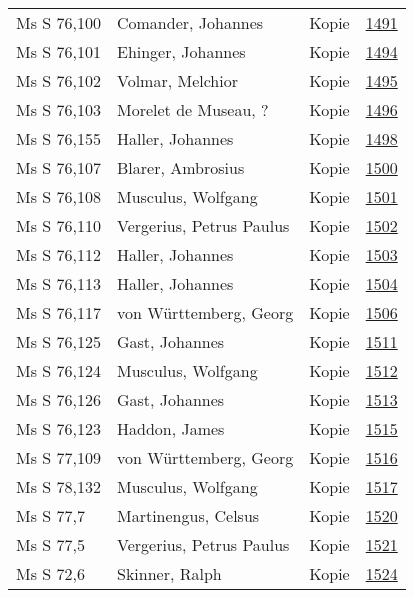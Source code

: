 \documentclass[10pt,a4paper,landscape]{report}
\begin{document}
\begin{longtable}{p{16cm}p{4cm}lr}
Ms S 76,100	&	Comander, Johannes	&	Kopie	&	\href{http://130.60.24.72/assignment/1491}{1491}\\
Ms S 76,101	&	Ehinger, Johannes	&	Kopie	&	\href{http://130.60.24.72/assignment/1494}{1494}\\
Ms S 76,102	&	Volmar, Melchior	&	Kopie	&	\href{http://130.60.24.72/assignment/1495}{1495}\\
Ms S 76,103	&	Morelet de Museau, ?	&	Kopie	&	\href{http://130.60.24.72/assignment/1496}{1496}\\
Ms S 76,155	&	Haller, Johannes	&	Kopie	&	\href{http://130.60.24.72/assignment/1498}{1498}\\
Ms S 76,107	&	Blarer, Ambrosius	&	Kopie	&	\href{http://130.60.24.72/assignment/1500}{1500}\\
Ms S 76,108	&	Musculus, Wolfgang	&	Kopie	&	\href{http://130.60.24.72/assignment/1501}{1501}\\
Ms S 76,110	&	Vergerius, Petrus Paulus	&	Kopie	&	\href{http://130.60.24.72/assignment/1502}{1502}\\
Ms S 76,112	&	Haller, Johannes	&	Kopie	&	\href{http://130.60.24.72/assignment/1503}{1503}\\
Ms S 76,113	&	Haller, Johannes	&	Kopie	&	\href{http://130.60.24.72/assignment/1504}{1504}\\
Ms S 76,117	&	von Württemberg, Georg	&	Kopie	&	\href{http://130.60.24.72/assignment/1506}{1506}\\
Ms S 76,125	&	Gast, Johannes	&	Kopie	&	\href{http://130.60.24.72/assignment/1511}{1511}\\
Ms S 76,124	&	Musculus, Wolfgang	&	Kopie	&	\href{http://130.60.24.72/assignment/1512}{1512}\\
Ms S 76,126	&	Gast, Johannes	&	Kopie	&	\href{http://130.60.24.72/assignment/1513}{1513}\\
Ms S 76,123	&	Haddon, James	&	Kopie	&	\href{http://130.60.24.72/assignment/1515}{1515}\\
Ms S 77,109	&	von Württemberg, Georg	&	Kopie	&	\href{http://130.60.24.72/assignment/1516}{1516}\\
Ms S 78,132	&	Musculus, Wolfgang	&	Kopie	&	\href{http://130.60.24.72/assignment/1517}{1517}\\
Ms S 77,7	&	Martinengus, Celsus	&	Kopie	&	\href{http://130.60.24.72/assignment/1520}{1520}\\
Ms S 77,5	&	Vergerius, Petrus Paulus	&	Kopie	&	\href{http://130.60.24.72/assignment/1521}{1521}\\
Ms S 72,6	&	Skinner, Ralph	&	Kopie	&	\href{http://130.60.24.72/assignment/1524}{1524}\\

\end{longtable}
\end{document}
